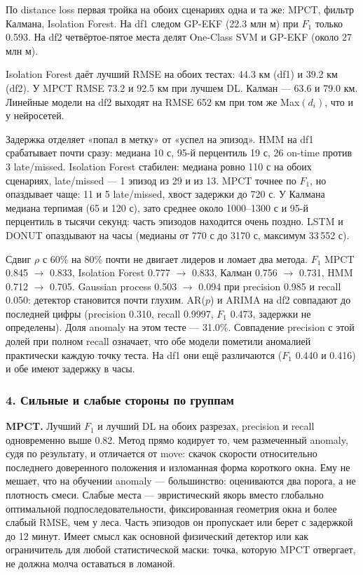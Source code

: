 \documentclass[a4paper,12pt]{report}
\begin{document}
По distance loss первая тройка на обоих сценариях одна и та же: MPCT, фильтр Калмана, Isolation Forest. На df1 следом GP-EKF (22.3 млн м) при $F_1$ только 0.593. На df2 четвёртое-пятое места делят One-Class SVM и GP-EKF (около 27 млн м).

Isolation Forest даёт лучший RMSE на обоих тестах: 44.3 км (df1) и 39.2 км (df2). У MPCT RMSE 73.2 и 92.5 км при лучшем DL. Калман — 63.6 и 79.0 км. Линейные модели на df2 выходят на RMSE 652 км при том же Max$(d_i)$, что и у нейросетей.

Задержка отделяет «попал в метку» от «успел на эпизод». HMM на df1 срабатывает почти сразу: медиана 10 с, 95-й перцентиль 19 с, 26 on-time против 3 late/missed. Isolation Forest стабилен: медиана ровно 110 с на обоих сценариях, late/missed — 1 эпизод из 29 и из 13. MPCT точнее по $F_1$, но опаздывает чаще: 11 и 5 late/missed, хвост задержки до 720 с. У Калмана медиана терпимая (65 и 120 с), зато среднее около 1000–1300 с и 95-й перцентиль в тысячи секунд: часть эпизодов находится очень поздно. LSTM и DONUT опаздывают на часы (медианы от 770 с до 3170 с, максимум 33\,552 с).

Сдвиг $\rho$ с 60\% на 80\% почти не двигает лидеров и ломает два метода. $F_1$ MPCT 0.845 $\to$ 0.833, Isolation Forest 0.777 $\to$ 0.833, Калман 0.756 $\to$ 0.731, HMM 0.712 $\to$ 0.705. Gaussian process 0.503 $\to$ 0.094 при precision 0.985 и recall 0.050: детектор становится почти глухим. AR($p$) и ARIMA на df2 совпадают до последней цифры (precision 0.310, recall 0.9997, $F_1$ 0.473, задержки не определены). Доля anomaly на этом тесте — 31.0\%. Совпадение precision с этой долей при полном recall означает, что обе модели пометили аномалией практически каждую точку теста. На df1 они ещё различаются ($F_1$ 0.440 и 0.416) и обе имеют задержку в часы.

\subsubsection{4. Сильные и слабые стороны по группам}

\textbf{MPCT.} Лучший $F_1$ и лучший DL на обоих разрезах, precision и recall одновременно выше 0.82. Метод прямо кодирует то, чем размеченный anomaly, судя по результату, и отличается от move: скачок скорости относительно последнего доверенного положения и изломанная форма короткого окна. Ему не мешает, что на обучении anomaly — большинство: оцениваются два порога, а не плотность смеси. Слабые места — эвристический якорь вместо глобально оптимальной подпоследовательности, фиксированная геометрия окна и более слабый RMSE, чем у леса. Часть эпизодов он пропускает или берет с задержкой до 12 минут. Имеет смысл как основной физический детектор или как ограничитель для любой статистической маски: точка, которую MPCT отвергает, не должна молча оставаться в ломаной.
\end{document}
